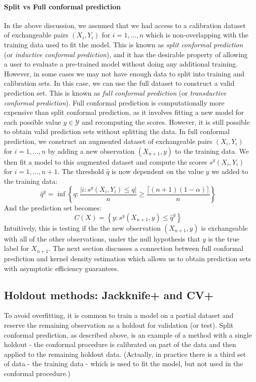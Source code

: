 \documentclass[a4paper, 12pt]{article}
\begin{document}
\paragraph*{Split vs Full conformal prediction} In the above discussion, we assumed that we had access to a calibration dataset of exchangeable pairs $(X_i, Y_i)$ for $i = 1, \ldots, n$ which is non-overlapping with the training data used to fit the model. This is known as \textit{split conformal prediction} (or \textit{inductive conformal prediction}), and it has the desirable property of allowing a user to evaluate a pre-trained model without doing any additional training. However, in some cases we may not have enough data to split into training and calibration sets. In this case, we can use the full dataset to construct a valid prediction set. This is known as \textit{full conformal prediction} (or \textit{transductive conformal prediction}). Full conformal prediction is computationally more expensive than split conformal prediction, as it involves fitting a new model for each possible value $y \in \mathcal{Y}$ and recomputing the scores. However, it is still possible to obtain valid prediction sets without splitting the data. In full conformal prediction, we construct an augmented dataset of exchangeable pairs $(X_i, Y_i)$ for $i = 1, \ldots, n$ by adding a new observation $(X_{n+1}, y)$ to the training data.
We then fit a model to this augmented dataset and compute the scores $s^y(X_i, Y_i)$ for $i = 1, \ldots, n+1$.
The threshold $\hat{q}$ is now dependent on the value $y$ we added to the training data:
\[ \hat{q}^y = \inf \left\{ q: \frac{\left| i : s^y(X_i, Y_i) \leq q \right|}{n} \geq \frac{\lceil (n+1)(1-\alpha) \rceil }{n} \right\} \]
And the prediction set becomes:
\[ C(X) = \left\{ y: s^y(X_{n+1}, y) \leq \hat{q}^y \right\} \]
Intuitively, this is testing if the the new observation $(X_{n+1}, y)$ is exchangeable with all of the other observations, under the null hypothesis that $y$ is the true label for $X_{n+1}$.
The next section discusses a connection between full conformal prediction and kernel density estimation which allows us to obtain prediction sets with asymptotic efficiency guarantees.

\subsection*{Holdout methods: Jackknife+ and CV+}
To avoid overfitting, it is common to train a model on a partial dataset and reserve the remaining observation as a holdout for validation (or test). Split conformal prediction, as described above, is an example of a method with a single holdout - the conformal procedure is calibrated on part of the data and then applied to the remaining holdout data. (Actually, in practice there is a third set of data - the training data - which is used to fit the model, but not used in the conformal procedure.)
\end{document}
